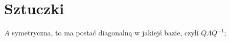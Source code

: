\section{Sztuczki}

\entry
$A$ symetryczna, to ma postać diagonalną w jakiejś bazie, czyli $Q\Lambda Q^{-1}$;
